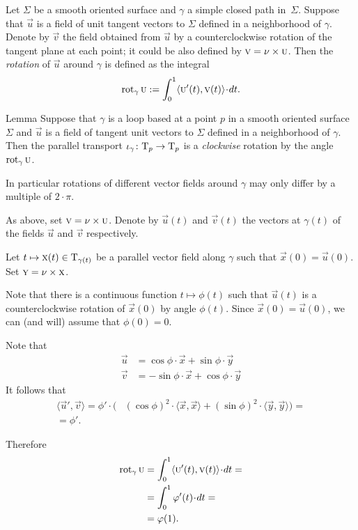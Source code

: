 Let $\Sigma$ be a smooth oriented surface and $\gamma$ a simple closed path in~$\Sigma$.
Suppose that $\vec u$ is a field of unit tangent vectors to $\Sigma$ defined in a neighborhood of $\gamma$.
Denote by $\vec v$ the field obtained from $\vec u$ by a counterclockwise rotation of the tangent plane at each point; it could be also defined by $\text{\sc{v}}=\nu\times\text{\sc{u}}$.
Then the \emph{rotation} of $\vec u$ around $\gamma$ is defined as the integral
\[\rot_\gamma\vec u
\df
\int_0^1\langle\vec u'(t),\vec v(t)\rangle\cdot dt.\]

\begin{thm}{Lemma}\label{lem:rotation-parallel}
Suppose that $\gamma$ is a loop based at a point $p$ in a smooth oriented surface $\Sigma$ and $\vec u$ is a field of tangent unit vectors to $\Sigma$ defined in a neighborhood of $\gamma$.
Then the parallel transport $\iota_\gamma\colon\mathrm{T}_p\to\mathrm{T}_p$ is a {}\emph{clockwise} rotation by the angle $\mathop{\rm rot}\nolimits_\gamma\text{\sc{u}}$.

In particular rotations of different vector fields around $\gamma$ may only differ by a multiple of $2\cdot\pi$.
\end{thm}

As above, set $\text{\sc{v}}=\nu\times\text{\sc{u}}$. 
Denote by $\vec u(t)$ and $\vec v(t)$ the vectors at $\gamma(t)$ of the fields $\vec u$ and $\vec v$ respectively.

Let $t\mapsto \text{\sc{x}}(t)\in \mathrm{T}_{\gamma(t)}$ be a parallel vector field along $\gamma$ such that $\vec x(0)=\vec u(0)$.
Set $\text{\sc{y}}=\nu\times\text{\sc{x}}$.

Note that there is a continuous function $t\mapsto \phi(t)$ such that 
$\vec u(t)$ is a counterclockwise rotation of $\vec x(0)$ by angle $\phi(t)$.
Since $\vec x(0)=\vec u(0)$, we can (and will) assume that $\phi(0)=0$.

Note that
\begin{align*}
\vec u&=\cos\phi\cdot \vec x+\sin\phi\cdot \vec y
\\
\vec v&=-\sin\phi\cdot \vec x+\cos\phi\cdot \vec y
\end{align*}
It follows that 
\begin{align*}
\langle\vec u',\vec v\rangle
=\phi'\cdot\biggl(&(\cos\phi)^2\cdot \langle\vec x,\vec x\rangle+(\sin\phi)^2\cdot \langle\vec y,\vec y\rangle
\biggr)=
\\
=\phi'.\ &
\end{align*}

Therefore
\begin{align*}
\rot_\gamma\vec u&=\int_0^1\langle\vec u'(t),\vec v(t)\rangle\cdot dt=
\\
&=\int_0^1\phi'(t)\cdot dt=
\\
&=\phi(1).
\end{align*}


